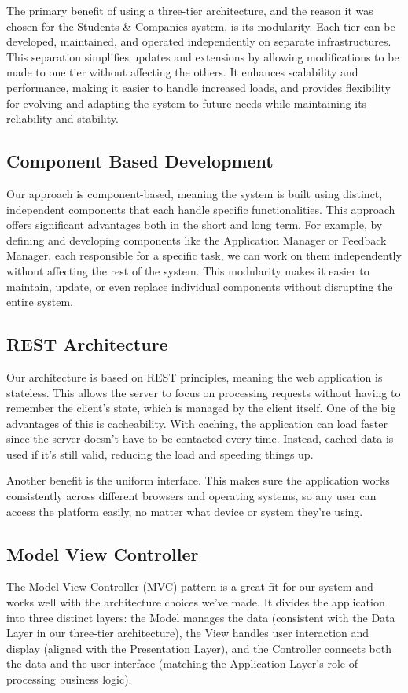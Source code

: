 The primary benefit of using a three-tier architecture, and the reason it was chosen for the Students \& Companies system, is its modularity. Each tier can be developed, maintained, and operated independently on separate infrastructures. This separation simplifies updates and extensions by allowing modifications to be made to one tier without affecting the others. It enhances scalability and performance, making it easier to handle increased loads, and provides flexibility for evolving and adapting the system to future needs while maintaining its reliability and stability.

\subsection{Component Based Development}
Our approach is component-based, meaning the system is built using distinct, independent components that each handle specific functionalities. This approach offers significant advantages both in the short and long term. For example, by defining and developing components like the Application Manager or Feedback Manager, each responsible for a specific task, we can work on them independently without affecting the rest of the system. This modularity makes it easier to maintain, update, or even replace individual components without disrupting the entire system.  

\subsection{REST Architecture}
Our architecture is based on REST principles, meaning the web application is stateless. This allows the server to focus on processing requests without having to remember the client's state, which is managed by the client itself. One of the big advantages of this is cacheability. With caching, the application can load faster since the server doesn’t have to be contacted every time. Instead, cached data is used if it’s still valid, reducing the load and speeding things up.

Another benefit is the uniform interface. This makes sure the application works consistently across different browsers and operating systems, so any user can access the platform easily, no matter what device or system they’re using.

\subsection{Model View Controller}
The Model-View-Controller (MVC) pattern is a great fit for our system and works well with the architecture choices we've made. It divides the application into three distinct layers: the Model manages the data (consistent with the Data Layer in our three-tier architecture), the View handles user interaction and display (aligned with the Presentation Layer), and the Controller connects both the data and the user interface (matching the Application Layer’s role of processing business logic).


